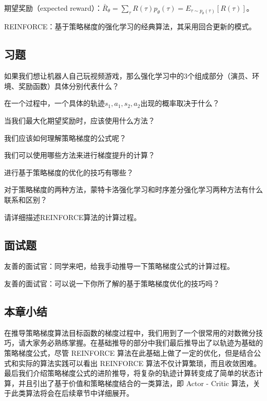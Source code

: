 期望奖励（expected reward）：$\bar{R}_{\theta}=\sum_{\tau} R(\tau) p_{\theta}(\tau)=E_{\tau \sim p_{\theta}(\tau)}[R(\tau)]$。

REINFORCE：基于策略梯度的强化学习的经典算法，其采用回合更新的模式。


\subsection{习题}

 如果我们想让机器人自己玩视频游戏，那么强化学习中的3个组成部分（演员、环境、奖励函数）具体分别代表什么？

 在一个过程中，一个具体的轨迹{$s_1 , a_1 , s_2 , a_2$}出现的概率取决于什么？

 当我们最大化期望奖励时，应该使用什么方法？

 我们应该如何理解策略梯度的公式呢？

 我们可以使用哪些方法来进行梯度提升的计算？

 进行基于策略梯度的优化的技巧有哪些？

 对于策略梯度的两种方法，蒙特卡洛强化学习和时序差分强化学习两种方法有什么联系和区别？

 请详细描述REINFORCE算法的计算过程。


\subsection{面试题}

 友善的面试官：同学来吧，给我手动推导一下策略梯度公式的计算过程。

 友善的面试官：可以说一下你所了解的基于策略梯度优化的技巧吗？
\subsection{本章小结}

在推导策略梯度算法目标函数的梯度过程中，我们用到了一个很常用的对数微分技巧，请大家务必熟练掌握。在基础推导的部分中我们最后推导出了以轨迹为基础的策略梯度公式，尽管 REINFORCE 算法在此基础上做了一定的优化，但是结合公式和实际的算法实践可以看出 REINFORCE 算法不仅计算繁琐，而且收敛困难。最后我们介绍策略梯度公式的进阶推导，将复杂的轨迹计算转变成了简单的状态计算，并且引出了基于价值和策略梯度结合的一类算法，即 Actor - Critic 算法，关于此类算法将会在后续章节中详细展开。







